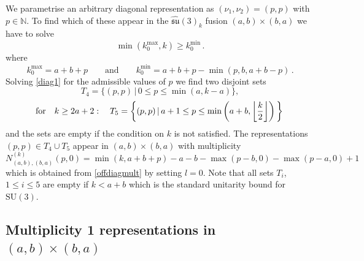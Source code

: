 \documentclass[a4paper,11pt]{article}
\DeclarePairedDelimiter\floor{\lfloor}{\rfloor}
\theoremstyle{plain}
\theoremstyle{definition}
\newcommand{\mycomment}[1]{}
\newcommand{\aff}{\widehat{\mathfrak{su}}(3)_k}
\begin{document}
We parametrise an arbitrary diagonal representation as $(\nu_1,\nu_2)=(p,p)$ with $p\in \mathbb{N}$. To find which of these appear in the $\aff$ fusion $(a,b)\times (b,a)$ we have to solve
\begin{equation}\label{diag1}
    \operatorname{min}(k_0^{\text{max}},k) \geq k_0^{\text{min}}\,.
\end{equation}
where 
\begin{equation}
    k_0^{\text{max}}=a+b+p \qquad \text{and}\qquad k_0^{\text{min}}=a+b+p-\operatorname{min}(p,b,a+b-p)\, .
\end{equation}
 Solving  \eqref{diag1} for the admissible values of $p$ we find two disjoint sets
    \begin{equation}\label{diag2}
       T_4=\{(p,p)\,|\, 0\leq p\leq \operatorname{min}(a,k-a)\},
    \end{equation}
    \begin{equation}\label{diag3}
       \text{for}\quad k\geq 2a+2:\quad T_5= \bigg\{(p,p)\,|\, a+1\leq p\leq \operatorname{min}\left(a+b,\floor*{\frac{k}{2}}\right)\bigg\}\,
    \end{equation}
    and the sets are empty if the condition on $k$ is not satisfied. 
The representations $(p,p)\in T_4\cup T_5$ appear in $(a,b)\times (b,a)$ with multiplicity
\begin{equation}\label{diagmult}
    N_{(a,b),(b,a)}^{(k)}(p,0)=\operatorname{min}(k,a+b+p)-a-b-\operatorname{max}(p-b,0)-\operatorname{max}(p-a,0)+1
\end{equation}
which is obtained from \eqref{offdiagmult}  by setting $l=0$. 
Note that all sets $T_{i}$, $1\le i\le 5$ are empty if $k<a+b$ which is the standard unitarity bound for $\mathrm{SU(3)}$.

\mycomment{
We can now  express the set of all representations appearing in the direct sum decomposition of $(a,b)\times (b,a)$ as
\begin{equation}
    \mathcal{R}^k_{(a,b),(b,a)}= \bigcup_{i=1}^5 T_i\,.
\end{equation} 
}




\subsection{Multiplicity 1 representations in  \texorpdfstring{$(a,b)\times(b,a)$}{(a,b)x(b,a)} }\label{sec4.3}
\end{document}
